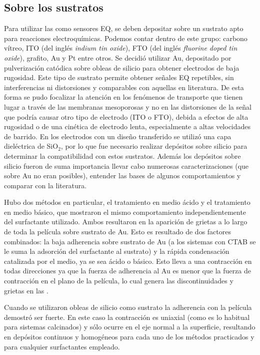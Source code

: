 	\subsection{Sobre los sustratos}

			Para utilizar las \pdm\space como sensores EQ, se deben depositar sobre un sustrato apto para reacciones electroquímicas. Podemos contar dentro de este grupo: carbono vítreo, ITO (del inglés \textit{indium tin oxide}), FTO (del inglés \textit{fluorine doped tin oxide}), grafito, Au y Pt entre otros.\cite{walcariussss2001,walcarius2013} Se decidió utilizar Au, depositado por pulverización catódica sobre obleas de silicio para obtener electrodos de baja rugosidad. Este tipo de sustrato permite obtener señales EQ repetibles, sin interferencias ni distorsiones y comparables con aquellas en literatura.\cite{Wi2000,Bockris1974} De esta forma se pudo focalizar la atención en los fenómenos de transporte que tienen lugar a través de las membranas mesoporosas y no en las distorsiones de la señal que podría causar otro tipo de electrodo (ITO o FTO), debida a efectos de alta rugosidad o de una cinética de electrodo lenta, especialmente a altas velocidades de barrido.			
		    En los electrodos con un diseño transferido se utilizó una capa dieléctrica de SiO$_2$, por lo que fue necesario realizar depósitos sobre silicio para determinar la compatibilidad con estos sustratos. Además los depósitos sobre silicio fueron de suma importancia llevar cabo numerosas caracterizaciones (que sobre Au no eran posibles), entender las bases de algunos comportamientos y comparar con la literatura.\cite{Innocenzi2013}

			Hubo dos métodos en particular, el tratamiento en medio ácido y el tratamiento en medio básico, que mostraron el mismo comportamiento independientemente del surfactante utilizado. Ambos resultaron en la aparición de grietas a lo largo de toda la película sobre sustrato de Au. Esto es resultado de dos factores combinados: la baja adherencia sobre sustrato de Au (a los sistemas con CTAB se le suma la adsorción del surfactante al sustrato) y la rápida condensación catalizada por el medio, ya se sea ácido o básico. Esto lleva a una contracción en todas direcciones ya que la fuerza de adherencia al Au es menor que la fuerza de contracción en el plano de la película, lo cual genera las discontinuidades y grietas en las \pdm. 

			Cuando se utilizaron obleas de silicio como sustrato la adherencia con la película demostró ser fuerte. En este caso la contracción es uniaxial (como es lo habitual para sistemas calcinados) y sólo ocurre en el eje normal a la superficie, resultando en depósitos continuos y homogéneos para cada uno de los métodos practicados y para cualquier surfactantes empleado.


